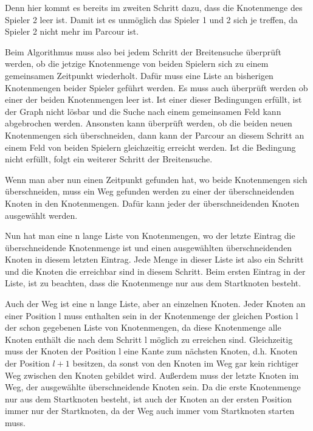 \documentclass[a4paper,10pt,ngerman]{scrartcl}
\begin{document}
    Denn hier kommt es bereits im zweiten Schritt dazu, dass die Knotenmenge des Spieler 2 leer ist.
    Damit ist es unmöglich das Spieler 1 und 2 sich je treffen, da Spieler 2 nicht mehr im Parcour ist.
    
    Beim Algorithmus muss also bei jedem Schritt der Breitensuche überprüft werden,
    ob die jetzige Knotenmenge von beiden Spielern sich
    zu einem gemeinsamen Zeitpunkt wiederholt.
    Dafür muss eine Liste an bisherigen Knotenmengen beider Spieler geführt werden.
    Es muss auch überprüft werden ob einer der beiden Knotenmengen leer ist.
    Ist einer dieser Bedingungen erfüllt, ist der Graph nicht lösbar
    und die Suche nach einem gemeinsamen Feld kann abgebrochen werden.
    Ansonsten kann überprüft werden,
    ob die beiden neuen Knotenmengen sich überschneiden,
    dann kann der Parcour an diesem Schritt an einem Feld
    von beiden Spielern gleichzeitig erreicht werden.
    Ist die Bedingung nicht erfüllt,
    folgt ein weiterer Schritt der Breitensuche.
    
    Wenn man aber nun einen Zeitpunkt gefunden hat,
    wo beide Knotenmengen sich überschneiden,
    muss ein Weg gefunden werden zu
    einer der überschneidenden Knoten in den Knotenmengen.
    Dafür kann jeder der überschneidenden Knoten ausgewählt werden.
    
    Nun hat man eine n lange Liste von Knotenmengen,
    wo der letzte Eintrag die überschneidende Knotenmenge ist
    und einen ausgewählten überschneidenden Knoten in diesem letzten Eintrag.
    Jede Menge in dieser Liste ist also ein Schritt
    und die Knoten die erreichbar sind in diesem Schritt.
    Beim ersten Eintrag in der Liste,
    ist zu beachten, dass die Knotenmenge nur aus dem Startknoten besteht.

	Auch der Weg ist eine n lange Liste,
	aber an einzelnen Knoten.
	Jeder Knoten an einer Position l muss enthalten sein
	in der Knotenmenge der gleichen Postion l der schon gegebenen Liste von Knotenmengen,
	da diese Knotenmenge alle Knoten enthält die nach dem Schritt l möglich zu erreichen sind.
	Gleichzeitig muss der Knoten der Position l eine Kante zum nächsten Knoten,
	d.h. Knoten der Position $l + 1$ besitzen,
	da sonst von den Knoten im Weg
	gar kein richtiger Weg zwischen den Knoten gebildet wird.
	Außerdem muss der letzte Knoten im Weg,
	der ausgewählte überschneidende Knoten sein.
	Da die erste Knotenmenge nur aus dem Startknoten besteht,
	ist auch der Knoten an der ersten Position immer nur der Startknoten,
	da der Weg auch immer vom Startknoten starten muss.
    
\end{document}

